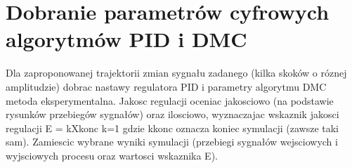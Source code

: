 \chapter{Dobranie parametrów cyfrowych algorytmów PID i DMC}
Dla zaproponowanej trajektorii zmian sygnału zadanego (kilka skoków o róznej amplitudzie)
dobrac nastawy regulatora PID i parametry algorytmu DMC metoda eksperymentalna.
Jakosc regulacji oceniac jakosciowo (na podstawie rysunków przebiegów
sygnałów) oraz ilosciowo, wyznaczajac wskaznik jakosci regulacji
E =
kXkonc
k=1
gdzie kkonc oznacza koniec symulacji (zawsze taki sam). Zamiescic wybrane wyniki
symulacji (przebiegi sygnałów wejsciowych i wyjsciowych procesu oraz wartosci wskaznika
E).